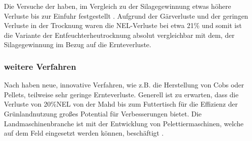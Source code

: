 Die Versuche der \HBLFA haben, im Vergleich zu der Silagegewinnung etwas höhere Verluste bis zur Einfuhr festgestellt \parencite{gruber2015einfluss}. 
Aufgrund der Gärverluste und der geringen Verluste in der Trocknung waren die \ac{NEL}-Verluste bei etwa 21\% und somit ist die Variante der Entfeuchterheutrocknung absolut vergleichbar mit dem, der Silagegewinnung \parencite[30]{fritz2018wirtschaftliche} im Bezug auf die Ernteverluste.


\subsubsection{weitere Verfahren}
\label{subsub:Peletts}
Nach \textcite[12f]{engel2013protein} haben neue, innovative Verfahren, wie z.B. die Herstellung von Cobs oder Pellets, teilweise sehr geringe Ernteverluste.
Generell ist zu erwarten, dass die Verluste von 20\%\ac{NEL} von der Mahd bis zum Futtertisch für die Effizienz der Grünlandnutzung großes Potential für Verbesserungen bietet.
Die Landmaschinenbranche ist mit der Entwicklung von Pelettiermaschinen, welche auf dem Feld eingesetzt werden können, beschäftigt \parencite[9]{schrammcrop}.

